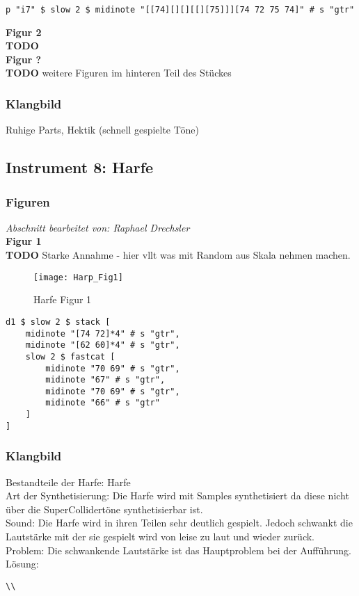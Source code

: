 \documentclass[
10pt, %
a4paper, %
oneside, %
headinclude,footinclude, %
BCOR5mm, %
]{scrartcl}
\begin{document}
\begin{lstlisting}
p "i7" $ slow 2 $ midinote "[[74][][][[][75]]][74 72 75 74]" # s "gtr"
\end{lstlisting}

\noindent\textbf{Figur 2}\\
{\color{red}\textbf{TODO}} \\

\noindent\textbf{Figur ?}\\
{\color{red}\textbf{TODO}} weitere Figuren im hinteren Teil des Stückes

\subsubsection{Klangbild}
Ruhige Parts, Hektik (schnell gespielte Töne)


\subsection{Instrument 8: Harfe}
\subsubsection{Figuren}
\textit{Abschnitt bearbeitet von: Raphael Drechsler}\\

\noindent\textbf{Figur 1}\\
{\color{red}\textbf{TODO}} Starke Annahme - hier vllt was mit Random aus Skala nehmen machen.
\begin{figure}[h]
	\centering 
	\texttt{[image: Harp\_Fig1]} 
	\caption{Harfe Figur 1}
\end{figure}

\begin{lstlisting}
d1 $ slow 2 $ stack [
	midinote "[74 72]*4" # s "gtr", 
	midinote "[62 60]*4" # s "gtr", 
	slow 2 $ fastcat [
		midinote "70 69" # s "gtr", 
		midinote "67" # s "gtr",
		midinote "70 69" # s "gtr", 
		midinote "66" # s "gtr"    
	]
]
\end{lstlisting}



\subsubsection{Klangbild}
Bestandteile der Harfe: Harfe\\
Art der Synthetisierung: Die Harfe wird mit Samples synthetisiert da diese nicht über die SuperCollidertöne synthetisierbar ist.\\
Sound: Die Harfe wird in ihren Teilen sehr deutlich gespielt. Jedoch schwankt die Lautstärke mit der sie gespielt wird von leise zu laut und wieder zurück.\\
Problem: Die schwankende Lautstärke ist das Hauptproblem bei der Aufführung.\\
Lösung:\\
\begin{lstlisting}
\\
\end{lstlisting}
\end{document}
